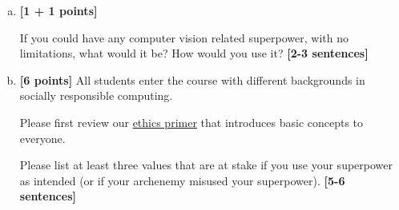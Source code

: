 \documentclass[11pt]{article}
\begin{document}
\begin{enumerate}[(a)]
    \item 
\textbf{[1 + 1 points]} 
\begin{tcolorbox}[colback=orange!5!white,colframe=orange!75!black]
If you could have any computer vision related superpower, with no limitations, what would it be? How would you use it? \textbf{[2-3 sentences]}
\end{tcolorbox}


    \item \textbf{[6 points]}
All students enter the course with different backgrounds in socially responsible computing. 

\begin{tcolorbox}[colback=orange!5!white,colframe=orange!75!black]
Please first review our \href{https://browncsci1430.github.io/webpage/resources/ethics_guide/}{ethics primer} that introduces basic concepts to everyone.

Please list at least three values that are at stake if you use your superpower as intended (or if your archenemy misused your superpower). \textbf{[5-6 sentences]}
\end{tcolorbox}


\end{enumerate}



\pagebreak
\end{document}
